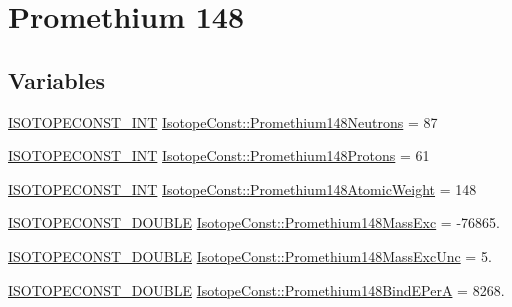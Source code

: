 \hypertarget{group___isotope_const-_promethium-_pm148}{}\section{Promethium 148}
\label{group___isotope_const-_promethium-_pm148}
\subsection*{Variables}
\begin{DoxyCompactItemize}
\item 
\mbox{\hyperlink{group___isotope_const-_macros_ga5f18360b3e99483a35c32d789e62621c}{I\+S\+O\+T\+O\+P\+E\+C\+O\+N\+S\+T\+\_\+\+I\+NT}} \mbox{\hyperlink{group___isotope_const-_promethium-_pm148_ga9e754ea49ca665090e9dea8018438b9d}{Isotope\+Const\+::\+Promethium148\+Neutrons}} = 87
\item 
\mbox{\hyperlink{group___isotope_const-_macros_ga5f18360b3e99483a35c32d789e62621c}{I\+S\+O\+T\+O\+P\+E\+C\+O\+N\+S\+T\+\_\+\+I\+NT}} \mbox{\hyperlink{group___isotope_const-_promethium-_pm148_gafdae0b6c5ea46f1c8f90b9268c741582}{Isotope\+Const\+::\+Promethium148\+Protons}} = 61
\item 
\mbox{\hyperlink{group___isotope_const-_macros_ga5f18360b3e99483a35c32d789e62621c}{I\+S\+O\+T\+O\+P\+E\+C\+O\+N\+S\+T\+\_\+\+I\+NT}} \mbox{\hyperlink{group___isotope_const-_promethium-_pm148_ga4414f73bd8c71992208e517b5ccfeec1}{Isotope\+Const\+::\+Promethium148\+Atomic\+Weight}} = 148
\item 
\mbox{\hyperlink{group___isotope_const-_macros_ga8f45a7272ce02c0b4c65c44636ed719a}{I\+S\+O\+T\+O\+P\+E\+C\+O\+N\+S\+T\+\_\+\+D\+O\+U\+B\+LE}} \mbox{\hyperlink{group___isotope_const-_promethium-_pm148_ga9b7fff002062d7b2fb5a783ed1bd1252}{Isotope\+Const\+::\+Promethium148\+Mass\+Exc}} = -\/76865.
\item 
\mbox{\hyperlink{group___isotope_const-_macros_ga8f45a7272ce02c0b4c65c44636ed719a}{I\+S\+O\+T\+O\+P\+E\+C\+O\+N\+S\+T\+\_\+\+D\+O\+U\+B\+LE}} \mbox{\hyperlink{group___isotope_const-_promethium-_pm148_ga31274c2a01fdfd9e9b60934156ba1d6d}{Isotope\+Const\+::\+Promethium148\+Mass\+Exc\+Unc}} = 5.
\item 
\mbox{\hyperlink{group___isotope_const-_macros_ga8f45a7272ce02c0b4c65c44636ed719a}{I\+S\+O\+T\+O\+P\+E\+C\+O\+N\+S\+T\+\_\+\+D\+O\+U\+B\+LE}} \mbox{\hyperlink{group___isotope_const-_promethium-_pm148_ga79654e4fb2d87411d3a926d43e2b660a}{Isotope\+Const\+::\+Promethium148\+Bind\+E\+PerA}} = 8268.

\end{DoxyCompactItemize}
